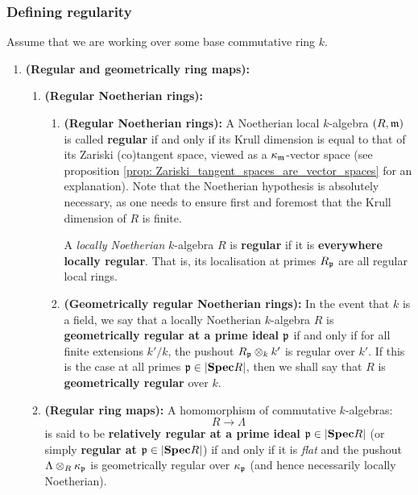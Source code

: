             \subsubsection{Defining regularity}
                \begin{definition}[Regularity] \label{def: regularity}  
                    Assume that we are working over some base commutative ring $k$.
                    \begin{enumerate}
                        \item \textbf{(Regular and geometrically ring maps):} 
                            \begin{enumerate}
                                \item \textbf{(Regular Noetherian rings):}
                                    \begin{enumerate}
                                        \item \textbf{(Regular Noetherian rings):} A Noetherian local $k$-algebra $(R, \mathfrak{m})$ is called \textbf{regular} if and only if its Krull dimension is equal to that of its Zariski (co)tangent space, viewed as a $\kappa_{\mathfrak{m}}$-vector space (see proposition \ref{prop: Zariski_tangent_spaces_are_vector_spaces} for an explanation). Note that the Noetherian hypothesis is absolutely necessary, as one needs to ensure first and foremost that the Krull dimension of $R$ is finite.
                                        
                                        A \textit{locally Noetherian} $k$-algebra $R$ is \textbf{regular} if it is \textbf{everywhere locally regular}. That is, its localisation at primes $R_{\mathfrak{p}}$ are all regular local rings.
                                        \item \textbf{(Geometrically regular Noetherian rings):} In the event that $k$ is a field, we say that a locally Noetherian $k$-algebra $R$ is \textbf{geometrically regular at a prime ideal $\mathfrak{p}$} if and only if for all finite extensions $k'/k$, the pushout $R_{\p} \tensor_k k'$ is regular over $k'$. If this is the case at all primes $\mathfrak{p} \in |\mathbf{Spec} R|$, then we shall say that $R$ is \textbf{geometrically regular} over $k$. 
                                    \end{enumerate}
                                \item \textbf{(Regular ring maps):} A homomorphism of commutative $k$-algebras:
                                    $$R \to \Lambda$$
                                is said to be \textbf{relatively regular at a prime ideal $\mathfrak{p} \in |\mathbf{Spec} R|$} (or simply \textbf{regular at $\mathfrak{p} \in |\mathbf{Spec} R|$}) if and only if it is \textit{flat} and the pushout $\Lambda \tensor_R \kappa_{\p}$ is geometrically regular over $\kappa_{\mathfrak{p}}$ (and hence necessarily locally Noetherian).
                                

\end{enumerate}
\end{enumerate}
\end{definition}
